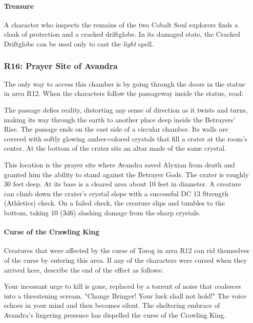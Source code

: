 \documentclass[10pt,a4,twoside,twocolumn,openany,nodeprecatedcode]{dndbook}
\begin{document}
\paragraph{Treasure}
A character who inspects the remains of the two Cobalt Soul explorers finds a cloak of protection and a cracked driftglobe. In its damaged state, the Cracked Driftglobe can be used only to cast the \textit{light} spell.
\subsubsection{R16: Prayer Site of Avandra}
The only way to access this chamber is by going through the doors in the statue in area R12. When the characters follow the passageway inside the statue, read:
\begin{DndReadAloud}{}
The passage defies reality, distorting any sense of direction as it twists and turns, making its way through the earth to another place deep inside the Betrayers' Rise. The passage ends on the east side of a circular chamber. Its walls are covered with softly glowing amber-colored crystals that fill a crater at the room's center. At the bottom of the crater sits an altar made of the same crystal.
\end{DndReadAloud}

This location is the prayer site where Avandra saved Alyxian from death and granted him the ability to stand against the Betrayer Gods. The crater is roughly 30 feet deep. At its base is a cleared area about 10 feet in diameter. A creature can climb down the crater's crystal slope with a successful DC 13 Strength (Athletics) check. On a failed check, the creature slips and tumbles to the bottom, taking 10 (3d6) slashing damage from the sharp crystals.
\paragraph{Curse of the Crawling King}
Creatures that were affected by the curse of Torog in area R12 can rid themselves of the curse by entering this area. If any of the characters were cursed when they arrived here, describe the end of the effect as follows:
\begin{DndReadAloud}{}
Your incessant urge to kill is gone, replaced by a torrent of noise that coalesces into a threatening scream.
"Change Bringer! Your luck shall not hold!"
The voice echoes in your mind and then becomes silent. The sheltering embrace of Avandra's lingering presence has dispelled the curse of the Crawling King.
\end{DndReadAloud}
\end{document}
